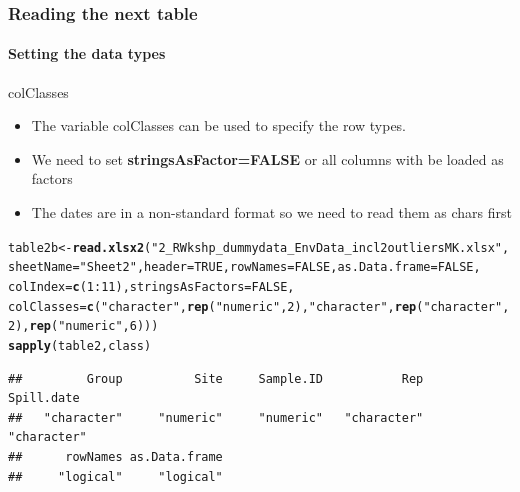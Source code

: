 \documentclass[12pt]{beamer}\usepackage[]{graphicx}\usepackage[]{color}
\makeatletter
\newcommand{\hlnum}[1]{\textcolor[rgb]{0.686,0.059,0.569}{#1}}%
\newcommand{\hlstr}[1]{\textcolor[rgb]{0.192,0.494,0.8}{#1}}%
\newcommand{\hlopt}[1]{\textcolor[rgb]{0,0,0}{#1}}%
\newcommand{\hlstd}[1]{\textcolor[rgb]{0.345,0.345,0.345}{#1}}%
\newcommand{\hlkwb}[1]{\textcolor[rgb]{0.69,0.353,0.396}{#1}}%
\newcommand{\hlkwc}[1]{\textcolor[rgb]{0.333,0.667,0.333}{#1}}%
\newcommand{\hlkwd}[1]{\textcolor[rgb]{0.737,0.353,0.396}{\textbf{#1}}}%
\newenvironment{kframe}{%
 \def\at@end@of@kframe{}%
 \ifinner\ifhmode%
  \def\at@end@of@kframe{\end{minipage}}%
  \begin{minipage}{\columnwidth}%
 \fi\fi%
 \def\FrameCommand##1{\hskip\@totalleftmargin \hskip-\fboxsep
 \colorbox{shadecolor}{##1}\hskip-\fboxsep
     \hskip-\linewidth \hskip-\@totalleftmargin \hskip\columnwidth}%
 \MakeFramed {\advance\hsize-\width
   \@totalleftmargin\z@ \linewidth\hsize
   \@setminipage}}%
 {\par\unskip\endMakeFramed%
 \at@end@of@kframe}
\newenvironment{knitrout}{}{} %
\makeatother
\begin{document}
\begin{frame}[fragile]
  \frametitle{Reading the next table}
  \framesubtitle{Setting the data types}
\begin{block}{colClasses}
\begin{itemize}
\item The variable colClasses can be used to specify the row types.
\item We need to set {\bf stringsAsFactor=FALSE} or all columns with be loaded as factors
\item The dates are in a non-standard format so we need to read them as chars first
\end{itemize}
\end{block}

\begin{knitrout}
\color{fgcolor}\begin{kframe}
\begin{alltt}
\hlstd{table2b}\hlkwb{<-}\hlkwd{read.xlsx2}\hlstd{(}\hlstr{"2_R Wkshp_dummy data_Env Data_incl2outliersMK.xlsx"}\hlstd{,}
\hlkwc{sheetName} \hlstd{=} \hlstr{"Sheet2"}\hlstd{,}\hlkwc{header}\hlstd{=}\hlnum{TRUE}\hlstd{,}\hlkwc{rowNames}\hlstd{=}\hlnum{FALSE}\hlstd{,}\hlkwc{as.Data.frame}\hlstd{=}\hlnum{FALSE}\hlstd{,}
\hlkwc{colIndex}\hlstd{=}\hlkwd{c}\hlstd{(}\hlnum{1}\hlopt{:}\hlnum{11}\hlstd{),}\hlkwc{stringsAsFactors}\hlstd{=}\hlnum{FALSE}\hlstd{,}
\hlkwc{colClasses}\hlstd{=}\hlkwd{c}\hlstd{(}\hlstr{"character"}\hlstd{,}\hlkwd{rep}\hlstd{(}\hlstr{"numeric"}\hlstd{,}\hlnum{2}\hlstd{),}\hlstr{"character"}\hlstd{,}\hlkwd{rep}\hlstd{(}\hlstr{"character"}\hlstd{,}\hlnum{2}\hlstd{),}\hlkwd{rep}\hlstd{(}\hlstr{"numeric"}\hlstd{,}\hlnum{6}\hlstd{)))}
\hlkwd{sapply}\hlstd{(table2,class)}
\end{alltt}
\begin{verbatim}
##         Group          Site     Sample.ID           Rep    Spill.date 
##   "character"     "numeric"     "numeric"   "character"   "character" 
##      rowNames as.Data.frame 
##     "logical"     "logical"
\end{verbatim}
\end{kframe}
\end{knitrout}
\clearpage
\end{frame}
\end{document}

